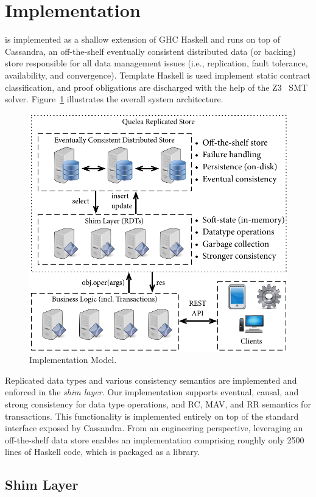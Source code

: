 \section{Implementation}
\label{sec:impl}

\name is implemented as a shallow extension of GHC Haskell and runs on top of
Cassandra, an off-the-shelf eventually consistent distributed data (or backing)
store responsible for all data management issues (i.e., replication, fault
tolerance, availability, and convergence).  Template Haskell is used implement
static contract classification, and proof obligations are discharged with the
help of the Z3~\cite{Z3} SMT solver. Figure~\ref{fig:impl_mod} illustrates the
overall system architecture.

\begin{figure}
\begin{center}
\includegraphics[width=0.7\columnwidth]{Figures/ImplModel}
\end{center}
\caption{Implementation Model.}
\label{fig:impl_mod}
\end{figure}

Replicated data types and various consistency semantics are implemented and
enforced in the \emph{shim layer}. Our implementation supports eventual,
causal, and strong consistency for data type operations, and RC, MAV, and RR
semantics for transactions.  This functionality is implemented entirely on
top of the standard interface exposed by Cassandra. From an engineering
perspective, leveraging an off-the-shelf data store enables an
implementation comprising roughly only 2500 lines of Haskell code, which is
packaged as a library.

\subsection{Shim Layer}

